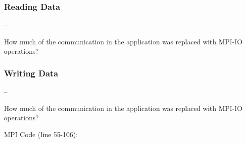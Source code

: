 \documentclass[9pt,pdftex,xcolor=dvipsnames]{beamer}
\begin{document}
\subsubsection{Reading Data}
\begin{frame}[fragile]{\insertsubsection--\insertsubsubsection}
\begin{overlayarea}{\textheight}{\textwidth}
How much of the communication in the application was replaced with MPI-IO operations? \\
\end{overlayarea}
\end{frame}

\subsubsection{Writing Data}
\begin{frame}[fragile]{\insertsubsection--\insertsubsubsection}
\begin{overlayarea}{\textheight}{\textwidth}
How much of the communication in the application was replaced with MPI-IO operations? \\
\begin{block}{MPI Code (line 55-106):}
\ioMPICodeWrite
\end{block}
\end{overlayarea}
\end{frame}
\end{document}

